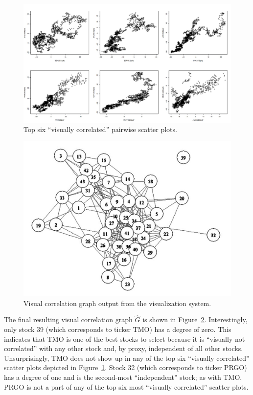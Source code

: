 \begin{figure}[htb]
	\begin{center}
		\includegraphics[width=1\linewidth]
		{ch-usage/figures/topinterestingplots}
		\caption[Top six ``visually correlated'' pairwise scatter plots.]{Top 
		six ``visually correlated'' pairwise scatter plots.}
		\label{fig:usage:interestingplots}
	\end{center}
\end{figure}

\tablespacing
\begin{figure}[H]
	\begin{center}
		\includegraphics[width=0.6\linewidth]
		{ch-usage/figures/visgraph}
		\caption[Visual correlation graph output from the visualization 
		system.]{Visual correlation
			graph output from the visualization system.}
		\label{fig:usage:visg}
	\end{center}
\end{figure}
\bodyspacing

The final resulting visual correlation graph $\hat{G}$ is shown in 
Figure~\ref{fig:usage:visg}. Interestingly, only stock 39 (which corresponds to 
ticker TMO) has a degree of zero. This indicates 
that TMO is one of the best stocks to select because it is ``visually not 
correlated'' with any other stock and, by proxy, independent of all other 
stocks. Unsurprisingly, 
TMO does not show up in any of the top six ``visually correlated'' scatter 
plots depicted in Figure~\ref{fig:usage:interestingplots}. Stock 32 (which 
corresponds to ticker PRGO) has a degree of one and is the second-most 
``independent'' stock; as with TMO, PRGO is not a part of any of the top six 
most ``visually correlated'' scatter plots.


